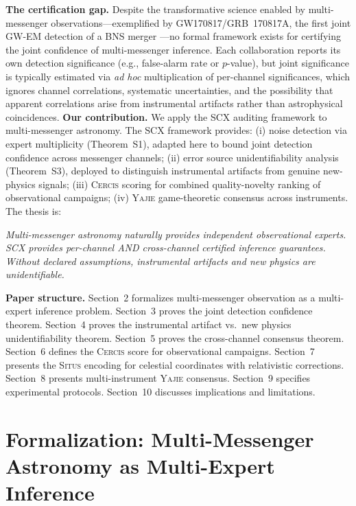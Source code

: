 \documentclass[11pt,a4paper]{article}
\theoremstyle{definition}
\newcommand{\Situs}{\textsc{Situs}}
\newcommand{\Yajie}{\textsc{Yajie}}
\newcommand{\Cercis}{\textsc{Cercis}}
\newcommand{\SCX}{\textsc{SCX}}
\newcommand{\ThmSCXNoise}{Theorem~S1}
\newcommand{\ThmSCXHonest}{Theorem~S3}
\begin{document}
\textbf{The certification gap.} Despite the transformative science enabled by multi-messenger observations---exemplified by GW170817/GRB~170817A, the first joint GW-EM detection of a BNS merger \cite{GW170817}---no formal framework exists for certifying the joint confidence of multi-messenger inference. Each collaboration reports its own detection significance (e.g., false-alarm rate or $p$-value), but joint significance is typically estimated via \textit{ad hoc} multiplication of per-channel significances, which ignores channel correlations, systematic uncertainties, and the possibility that apparent correlations arise from instrumental artifacts rather than astrophysical coincidences.
\textbf{Our contribution.} We apply the \SCX{} auditing framework \cite{SCX2025} to multi-messenger astronomy. The \SCX{} framework provides: (i) noise detection via expert multiplicity (\ThmSCXNoise), adapted here to bound joint detection confidence across messenger channels; (ii) error source unidentifiability analysis (\ThmSCXHonest), deployed to distinguish instrumental artifacts from genuine new-physics signals; (iii) \Cercis{} scoring for combined quality-novelty ranking of observational campaigns; (iv) \Yajie{} game-theoretic consensus across instruments. The thesis is:
\begin{center}
\emph{Multi-messenger astronomy naturally provides independent observational experts.\\
\SCX{} provides per-channel AND cross-channel certified inference guarantees.\\
Without declared assumptions, instrumental artifacts and new physics are unidentifiable.}
\end{center}
\textbf{Paper structure.} Section~2 formalizes multi-messenger observation as a multi-expert inference problem. Section~3 proves the joint detection confidence theorem. Section~4 proves the instrumental artifact vs.\ new physics unidentifiability theorem. Section~5 proves the cross-channel consensus theorem. Section~6 defines the \Cercis{} score for observational campaigns. Section~7 presents the \Situs{} encoding for celestial coordinates with relativistic corrections. Section~8 presents multi-instrument \Yajie{} consensus. Section~9 specifies experimental protocols. Section~10 discusses implications and limitations.
\section{Formalization: Multi-Messenger Astronomy as Multi-Expert Inference}
\label{sec:formulation}
\end{document}
